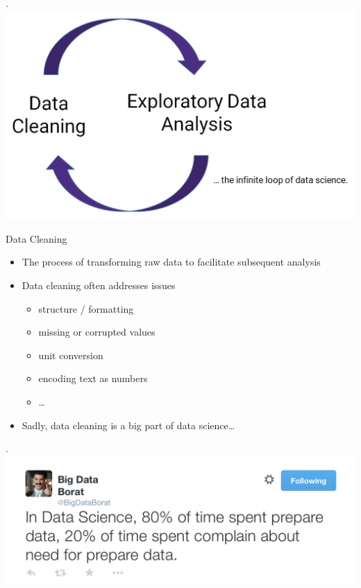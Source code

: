 \documentclass[aspectratio=169]{../latex_main/tntbeamer}  %
\begin{document}
	
	
	\begin{frame}{.}
	    \centering
	    \includegraphics[scale=.38]{Bild4}
	\end{frame}
	
	
	\begin{frame}{Data Cleaning}
	    \begin{itemize}
	        \item The process of transforming raw data to facilitate subsequent analysis
	        \item Data cleaning often addresses issues
	        \begin{itemize}
	            \item structure / formatting
	            \item missing or corrupted values
	            \item unit conversion
	            \item encoding text as numbers
	            \item \dots
	        \end{itemize}
            \item Sadly, data cleaning is a big part of data science…

	    \end{itemize}
	\end{frame}
	
	
	
	
	\begin{frame}{.}
	    \centering
	    \includegraphics[scale=.7]{Bild5}
	\end{frame}
	
\end{document}
